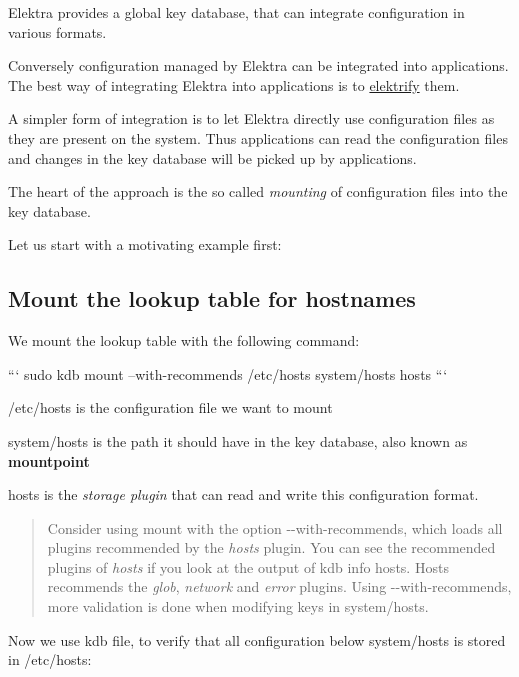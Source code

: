 Elektra provides a global key database, that can integrate configuration in various formats.

Conversely configuration managed by Elektra can be integrated into applications. The best way of integrating Elektra into applications is to \hyperlink{md_doc_help_elektra-glossary_doc_help_elektra-glossary_md}{elektrify} them.

A simpler form of integration is to let Elektra directly use configuration files as they are present on the system. Thus applications can read the configuration files and changes in the key database will be picked up by applications.

The heart of the approach is the so called {\itshape mounting} of configuration files into the key database.

Let us start with a motivating example first\+:

\subsection*{Mount the lookup table for hostnames}

We mount the lookup table with the following command\+:

``` sudo kdb mount --with-\/recommends /etc/hosts system/hosts hosts ```


\begin{DoxyEnumerate}
\item {\ttfamily /etc/hosts} is the configuration file we want to mount
\item {\ttfamily system/hosts} is the path it should have in the key database, also known as {\bfseries mountpoint}
\item {\ttfamily hosts} is the {\itshape storage plugin} that can read and write this configuration format.
\end{DoxyEnumerate}

\begin{quote}
Consider using mount with the option {\ttfamily -\/-\/with-\/recommends}, which loads all plugins recommended by the {\itshape hosts} plugin. You can see the recommended plugins of {\itshape hosts} if you look at the output of {\ttfamily kdb info hosts}. Hosts recommends the {\itshape glob}, {\itshape network} and {\itshape error} plugins. Using {\ttfamily -\/-\/with-\/recommends}, more validation is done when modifying keys in {\ttfamily system/hosts}. \end{quote}


Now we use {\ttfamily kdb file}, to verify that all configuration below {\ttfamily system/hosts} is stored in {\ttfamily /etc/hosts}\+:


